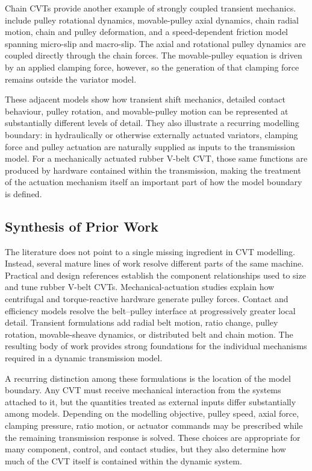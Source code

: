 \documentclass[11pt]{report}
\numberwithin{equation}{section}
\begin{document}
Chain CVTs provide another example of strongly coupled transient mechanics. \citet{DuanEtAl2016} include pulley rotational dynamics, movable-pulley axial dynamics, chain radial motion, chain and pulley deformation, and a speed-dependent friction model spanning micro-slip and macro-slip. The axial and rotational pulley dynamics are coupled directly through the chain forces. The movable-pulley equation is driven by an applied clamping force, however, so the generation of that clamping force remains outside the variator model.

These adjacent models show how transient shift mechanics, detailed contact behaviour, pulley rotation, and movable-pulley motion can be represented at substantially different levels of detail. They also illustrate a recurring modelling boundary: in hydraulically or otherwise externally actuated variators, clamping force and pulley actuation are naturally supplied as inputs to the transmission model. For a mechanically actuated rubber V-belt CVT, those same functions are produced by hardware contained within the transmission, making the treatment of the actuation mechanism itself an important part of how the model boundary is defined.

\subsection{Synthesis of Prior Work}
\label{sec:lit-synthesis}

The literature does not point to a single missing ingredient in CVT modelling.
Instead, several mature lines of work resolve different parts of the same
machine. Practical and design references establish the component relationships
used to size and tune rubber V-belt CVTs. Mechanical-actuation studies explain
how centrifugal and torque-reactive hardware generate pulley forces. Contact
and efficiency models resolve the belt--pulley interface at progressively
greater local detail. Transient formulations add radial belt motion, ratio
change, pulley rotation, movable-sheave dynamics, or distributed belt and chain
motion. The resulting body of work provides strong foundations for the
individual mechanisms required in a dynamic transmission model.

A recurring distinction among these formulations is the location of the model
boundary. Any CVT must receive mechanical interaction from the systems attached
to it, but the quantities treated as external inputs differ substantially among
models. Depending on the modelling objective, pulley speed, axial force,
clamping pressure, ratio motion, or actuator commands may be prescribed while
the remaining transmission response is solved. These choices are appropriate
for many component, control, and contact studies, but they also determine how
much of the CVT itself is contained within the dynamic system.
\end{document}
